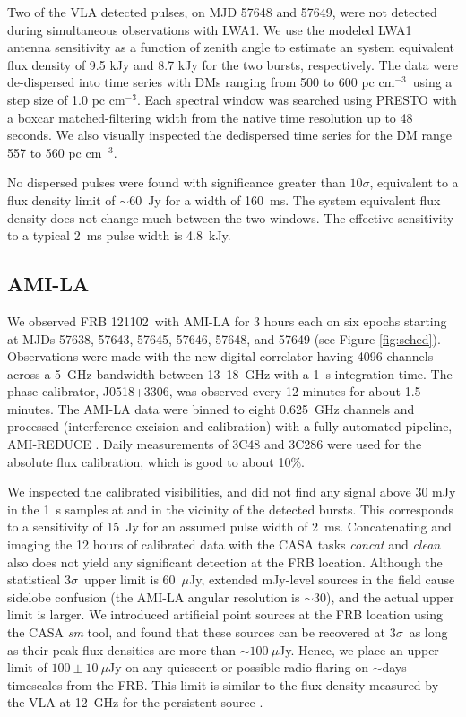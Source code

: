 \documentclass[twocolumn]{aastex61}
\newcommand{\frb}{FRB 121102}
\begin{document}
Two of the VLA detected pulses, on MJD 57648 and 57649, were not detected during simultaneous observations with LWA1. We use the modeled LWA1 antenna sensitivity as a function of zenith angle to estimate an system equivalent flux density of 9.5 kJy and 8.7 kJy for the two bursts, respectively. The data were de-dispersed into time series with DMs ranging from 500 to 600 pc cm$^{-3}$\ using a step size of 1.0 pc cm$^{-3}$. Each spectral window was searched using PRESTO \citep{2001PhDT.......123R} with a boxcar matched-filtering width from the native time resolution up to 48 seconds. We also visually inspected the dedispersed time series for the DM range 557 to 560 pc cm$^{-3}$.

No dispersed pulses were found with significance greater than $10\sigma$, equivalent to a flux density limit of $\sim60$\ Jy for a width of 160~ms. The system equivalent flux density does not change much between the two windows. The effective sensitivity to a typical 2~ms pulse width is 4.8~kJy.

\subsection{AMI-LA}

We observed \frb\ with AMI-LA for 3 hours each on six epochs starting at MJDs 57638, 57643, 57645, 57646, 57648, and 57649 (see Figure \ref{fig:sched}). Observations were made with the new digital correlator having 4096 channels across a 5~GHz bandwidth between 13--18~GHz with a 1~s integration time. The phase calibrator, J0518+3306, was observed every 12 minutes for about 1.5 minutes. The AMI-LA data were binned to eight 0.625~GHz channels and processed (interference excision and calibration) with a fully-automated pipeline, AMI-REDUCE \citep[e.g.,][]{2013MNRAS.429.3330P}. Daily measurements of 3C48 and 3C286 were used for the absolute flux calibration, which is good to about 10\%. 

We inspected the calibrated visibilities, and did not find any signal above 30 mJy in the 1~s samples at and in the vicinity of the detected bursts. This corresponds to a sensitivity of 15~Jy for an assumed pulse width of 2~ms. Concatenating and imaging the 12 hours of calibrated data with the CASA tasks {\it concat} and {\it clean} also does not yield any significant detection at the FRB location. Although the statistical $3\sigma$\ upper limit is 60~$\mu$Jy, extended mJy-level sources in the field cause sidelobe confusion (the AMI-LA angular resolution is $\sim$30\arcsec), and the actual upper limit is larger. We introduced artificial point sources at the FRB location using the CASA {\it sm} tool, and found that these sources can be recovered at $3\sigma$\ as long as their peak flux densities are more than $\sim100~\mu$Jy. Hence, we place an upper limit of $100\pm10~\mu$Jy on any quiescent or possible radio flaring on $\sim$days timescales from the FRB. This limit is similar to the flux density measured by the VLA at 12~GHz for the persistent source \citep{LOC}.
\end{document}
